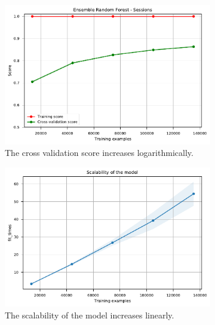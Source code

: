 \documentclass{l4proj}
\begin{document}
\begin{appendices}
\begin{figure}[htbp]
    \centering
    \begin{subfigure}[b]{0.70\textwidth}
        \includegraphics[width=\textwidth]{images/sessions/learning_curve_1_EnsembleRandomForestSessions.pdf}
        \caption{The cross validation score increases logarithmically.}
        \label{fig:learning_curve_1_EnsembleRandomForestSessions}
    \end{subfigure}
    \begin{subfigure}[b]{0.70\textwidth}
        \includegraphics[width=\textwidth]{images/sessions/learning_curve_2_EnsembleRandomForestSessions}
        \caption{The scalability of the model increases linearly.}
        \label{fig:learning_curve_2_EnsembleRandomForestSessions}
    \end{subfigure}
    \begin{subfigure}[b]{0.70\textwidth}

\end{subfigure}
\end{figure}
\end{appendices}
\end{document}
